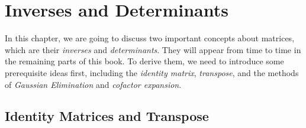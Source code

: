 \chapter{Inverses and Determinants}

In this chapter, we are going to discuss two important concepts about matrices, which are their \textit{inverses} and \textit{determinants}. They will appear from time to time in the remaining parts of this book. To derive them, we need to introduce some prerequisite ideas first, including the \textit{identity matrix}, \textit{transpose}, and the methods of \textit{Gaussian Elimination} and \textit{cofactor expansion}.

\section{Identity Matrices and Transpose}

